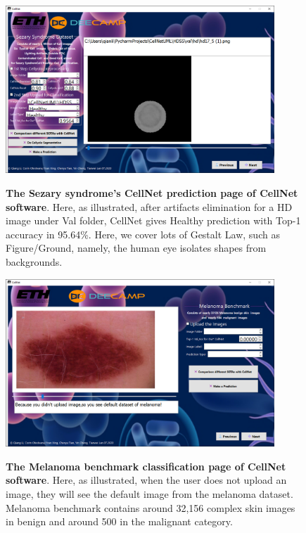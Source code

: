 \begin{figure}[t]
\begin{center}
\includegraphics[height=0.3\textheight,width=0.9\textwidth]{thesis-template-master/images/cellnet5-3page.PNG}
\label{fig:cellnet}
\end{center}
\caption{ \textbf{The Sezary syndrome's CellNet prediction page of CellNet software}. Here, as illustrated, after artifacts elimination for a HD image under Val folder, CellNet gives Healthy prediction with Top-1 accuracy in 95.64\%. Here, we cover lots of Gestalt Law, such as Figure/Ground, namely, the human eye isolates shapes from backgrounds.}
\label{fig:6.15}
\end{figure}


\begin{figure}[t]
\begin{center}
\includegraphics[height=0.3\textheight,width=0.9\textwidth]{thesis-template-master/images/cellnet6-1page.PNG}
\label{fig:cellnet}
\end{center}
\caption{ \textbf{The Melanoma benchmark \cite{melanoma} classification page of CellNet software}. Here, as illustrated, when the user does not upload an image, they will see the default image from the melanoma dataset. Melanoma benchmark\cite{melanoma}  contains around 32,156 complex skin images in benign and around 500 in the malignant category.}
\label{fig:6.16}
\end{figure}


